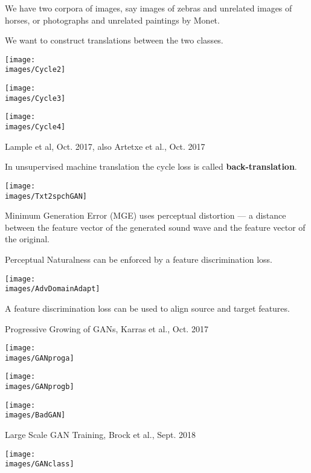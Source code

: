{We have two corpora of images, say images of zebras and unrelated images of horses, or photographs and unrelated paintings by Monet.

\vfill
We want to construct translations between the two classes.

\centerline{\texttt{[image: \\images/Cycle2]}}


\centerline{\texttt{[image: \\images/Cycle3]}}


\centerline{\texttt{[image: \\images/Cycle4]}}

         {Lample et al, Oct. 2017, also Artetxe et al., Oct. 2017}


In unsupervised machine translation the cycle loss is called {\bf back-translation}.


\centerline{\texttt{[image: \\images/Txt2spchGAN]}}

\vfill
Minimum Generation Error (MGE) uses {\color{red} perceptual distortion} ---
a distance between the feature vector of the generated sound wave and the
feature vector of the original.

\vfill
{\color{red}Perceptual Naturalness} can be enforced by a feature discrimination loss.


\centerline{\texttt{[image: \\images/AdvDomainAdapt]}}

A feature discrimination loss can be used to align source and target features.


\centerline{Progressive Growing of GANs, Karras et al., Oct. 2017}

\centerline{\texttt{[image: \\images/GANproga]}}


\centerline{\texttt{[image: \\images/GANprogb]}}


\centerline{\texttt{[image: \\images/BadGAN]}}

\centerline{Large Scale GAN Training, Brock et al., Sept. 2018}
\centerline{\texttt{[image: \\images/GANclass]}}

}
